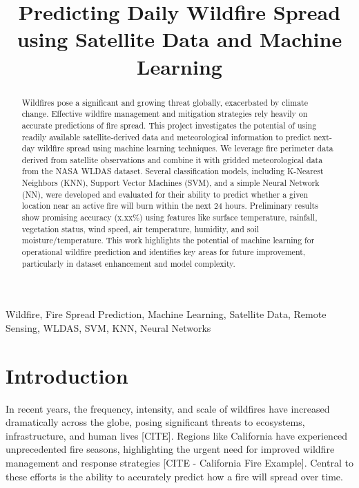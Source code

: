\documentclass[conference]{IEEEtran}
\begin{document}
\title{Predicting Daily Wildfire Spread using Satellite Data and Machine Learning}

\author{ %
}

\maketitle %

\begin{abstract}
Wildfires pose a significant and growing threat globally, exacerbated by climate change. Effective wildfire management and mitigation strategies rely heavily on accurate predictions of fire spread. This project investigates the potential of using readily available satellite-derived data and meteorological information to predict next-day wildfire spread using machine learning techniques. We leverage fire perimeter data derived from satellite observations and combine it with gridded meteorological data from the NASA WLDAS dataset. Several classification models, including K-Nearest Neighbors (KNN), Support Vector Machines (SVM), and a simple Neural Network (NN), were developed and evaluated for their ability to predict whether a given location near an active fire will burn within the next 24 hours. Preliminary results show promising accuracy (x.xx\%) using features like surface temperature, rainfall, vegetation status, wind speed, air temperature, humidity, and soil moisture/temperature. This work highlights the potential of machine learning for operational wildfire prediction and identifies key areas for future improvement, particularly in dataset enhancement and model complexity.
\end{abstract}

\begin{IEEEkeywords}
Wildfire, Fire Spread Prediction, Machine Learning, Satellite Data, Remote Sensing, WLDAS, SVM, KNN, Neural Networks
\end{IEEEkeywords}

\section{Introduction}
In recent years, the frequency, intensity, and scale of wildfires have increased dramatically across the globe, posing significant threats to ecosystems, infrastructure, and human lives [CITE]. Regions like California have experienced unprecedented fire seasons, highlighting the urgent need for improved wildfire management and response strategies [CITE - California Fire Example]. Central to these efforts is the ability to accurately predict how a fire will spread over time.
\end{document}
